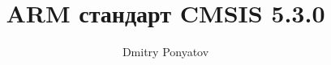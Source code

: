 

\author{Dmitry Ponyatov }
\title{ARM стандарт CMSIS 5.3.0}



\maketitle
\tableofcontents
\secdown


